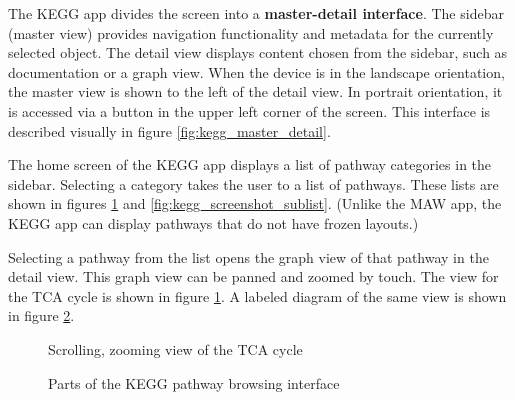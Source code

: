 The KEGG app divides the screen into a \textbf{master-detail interface}. The
sidebar (master view) provides navigation functionality and metadata for the
currently selected object. The detail view displays content chosen from the
sidebar, such as documentation or a graph view. When the device is in the
landscape orientation, the master view is shown to the left of the detail view.
In portrait orientation, it is accessed via a button in the upper left corner of
the screen. This interface is described visually in figure
\ref{fig:kegg_master_detail}.

The home screen of the KEGG app displays a list of pathway categories in the
sidebar. Selecting a category takes the user to a list of pathways. These lists
are shown in figures \ref{fig:kegg_screenshot_pathway} and
\ref{fig:kegg_screenshot_sublist}.  (Unlike the MAW app, the KEGG app can
display pathways that do not have frozen layouts.)

Selecting a pathway from the list opens the graph view of that pathway in the
detail view. This graph view can be panned and zoomed by touch. The view for
the TCA cycle is shown in figure \ref{fig:kegg_screenshot_pathway}. A labeled
diagram of the same view is shown in figure \ref{fig:kegg_pathway_diagram}.

\begin{figure}[hbt]
    \caption{\label{fig:kegg_screenshot_pathway} Scrolling, zooming view of
    the TCA cycle}
\end{figure}

\begin{figure}[hbt]
    \caption{\label{fig:kegg_pathway_diagram} Parts of the KEGG pathway browsing
    interface}
\end{figure}

